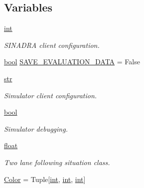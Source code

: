 \subsection*{Variables}
\begin{DoxyCompactItemize}
\item 
\hyperlink{namespaceimplementation_1_1sinadra__configuration__parameters_a1053d4f6819fcba166f4cf443ab0123d}{int}
\begin{DoxyCompactList}\small\item\em S\+I\+N\+A\+D\+RA client configuration. \end{DoxyCompactList}\item 
\hyperlink{namespaceimplementation_1_1sinadra__configuration__parameters_ab4378b9fde208d554afa97838c7ee6f0}{bool} \hyperlink{namespaceimplementation_1_1sinadra__configuration__parameters_a159fbe7395760deb47b0d5ed98932238}{S\+A\+V\+E\+\_\+\+E\+V\+A\+L\+U\+A\+T\+I\+O\+N\+\_\+\+D\+A\+TA} = False
\item 
\hyperlink{namespaceimplementation_1_1sinadra__configuration__parameters_aa676135fcf929cc61534d6ba65d198bb}{str}
\begin{DoxyCompactList}\small\item\em Simulator client configuration. \end{DoxyCompactList}\item 
\hyperlink{namespaceimplementation_1_1sinadra__configuration__parameters_ab4378b9fde208d554afa97838c7ee6f0}{bool}
\begin{DoxyCompactList}\small\item\em Simulator debugging. \end{DoxyCompactList}\item 
\hyperlink{namespaceimplementation_1_1sinadra__configuration__parameters_a6b4262e47247fcaacec78f8286676cbf}{float}
\begin{DoxyCompactList}\small\item\em Two lane following situation class. \end{DoxyCompactList}\item 
\hyperlink{namespaceimplementation_1_1sinadra__configuration__parameters_a8070d83bf7a5e63240b72e3f1a25fa25}{Color} = Tuple\mbox{[}\hyperlink{namespaceimplementation_1_1sinadra__configuration__parameters_a1053d4f6819fcba166f4cf443ab0123d}{int}, \hyperlink{namespaceimplementation_1_1sinadra__configuration__parameters_a1053d4f6819fcba166f4cf443ab0123d}{int}, \hyperlink{namespaceimplementation_1_1sinadra__configuration__parameters_a1053d4f6819fcba166f4cf443ab0123d}{int}\mbox{]}

\end{DoxyCompactItemize}
